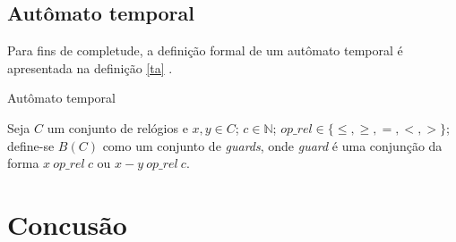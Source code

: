 \documentclass{utfpr-pg}
\begin{document}
\section{Autômato temporal}
Para fins de completude, a definição formal de um autômato temporal é apresentada na definição \ref{ta} \cite{secret}.

\begin{definicao}
  \captionsetup{justification=raggedright,
singlelinecheck=false
}
  \caption{Autômato temporal}
  \label{ta}
  Seja $\mathit{C}$ um conjunto de relógios e $\mathit{x},\mathit{y} \in C$; $\mathit{c}\in\mathbb{N}$; $op\_rel \in \{\leq,\geq,=,<,>\}$; define-se $B(C)$ como um conjunto de \textit{guards}, onde \textit{guard} é uma conjunção da forma $\mathit{x}\ op\_rel\ \mathit{c}$ ou $\mathit{x}-\mathit{y}\ op\_rel\ \mathit{c}$.    
\end{definicao}

%

\chapter[Conclusão]{Concusão}
\lipsum[1]


\postextual



\end{document}
